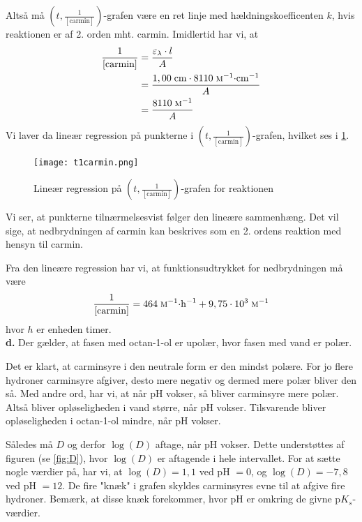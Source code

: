 \documentclass{report}
\begin{document}
Altså må $(t, \frac{1}{[\text{carmin} ]})$-grafen være en ret linje med hældningskoefficenten $k$, hvis reaktionen er af 2. orden mht. carmin.
Imidlertid har vi, at
\begin{equation*}
\begin{split}
\frac{1}{[\text{carmin} ]}&=\frac{\varepsilon _{\lambda } \cdot l}{A}\\
  &=\frac{1,00 \;\unit{cm} \cdot 8110 \;\unit{\textsc{m}^{-1}\cdot cm ^{-1}} }{A}\\
  &=\frac{8110 \;\unit{\textsc{m}^{-1}} }{A}
\end{split}
\end{equation*}
Vi laver da lineær regression på punkterne i $(t, \frac{1}{[\text{carmin} ]})$-grafen, hvilket ses i \cref{fig:t1carmin}.
\begin{figure}[H]
\begin{center}
  \texttt{[image: t1carmin.png]}
\end{center}
\caption{Lineær regression på $(t, \frac{1}{[\text{carmin} ]})$-grafen for reaktionen}
\label{fig:t1carmin}
\end{figure}
Vi ser, at punkterne tilnærmelsesvist følger den lineære sammenhæng.
Det vil sige, at nedbrydningen af carmin kan beskrives som en 2. ordens reaktion med hensyn til carmin.

Fra den lineære regression har vi, at funktionsudtrykket for nedbrydningen må være
\begin{equation*}
\begin{split}
  \frac{1}{[\text{carmin} ]}=464 \;\unit{\textsc{m}^{-1}\cdot h ^{-1}} + 9,75 \cdot 10^3 \;\unit{\textsc{m}^{-1}} 
\end{split}
\end{equation*}
hvor $h$ er enheden timer.\\[1ex]
\textbf{d.}
Der gælder, at fasen med octan-1-ol er upolær, hvor fasen med vand er polær.

Det er klart, at carminsyre i den neutrale form er den mindst polære.
For jo flere hydroner carminsyre afgiver, desto mere negativ og dermed mere polær bliver den så.
Med andre ord, har vi, at når pH vokser, så bliver carminsyre mere polær.
Altså bliver opløseligheden i vand større, når pH vokser.
Tilsvarende bliver opløseligheden i octan-1-ol mindre, når pH vokser.

Således må $D$ og derfor $\log\left(D\right) $ aftage, når pH vokser. 
Dette understøttes af figuren (se \cref{fig:D}), hvor $\log\left(D\right)$ er aftagende i hele intervallet. 
For at sætte nogle værdier på, har vi, at $\log\left(D\right) =1,1$ ved pH $=0$, og $\log\left(D\right) =-7,8$ ved pH $=12$. 
De fire "knæk" i grafen skyldes carminsyres evne til at afgive fire hydroner.
Bemærk, at disse knæk forekommer, hvor pH er omkring de givne p$K_s$-værdier.
\end{document}
